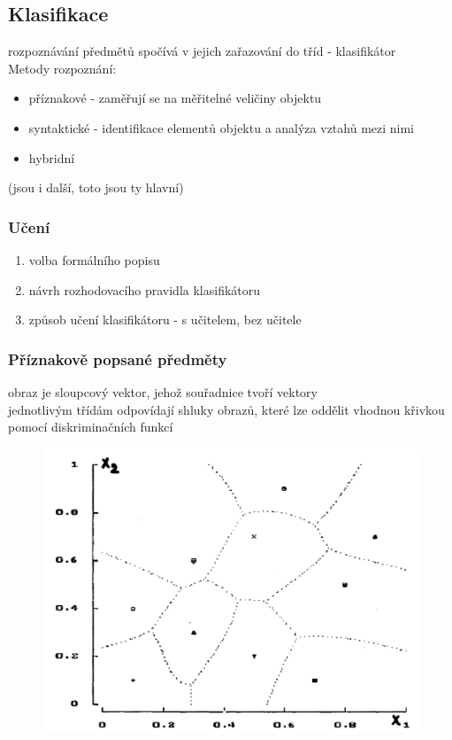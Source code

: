 \subsection*{Klasifikace}
rozpoznávání předmětů spočívá v jejich zařazování do tříd - klasifikátor\\
Metody rozpoznání:
\begin{itemize}
    \item příznakové - zaměřují se na měřitelné veličiny objektu
    \item syntaktické - identifikace elementů objektu a analýza vztahů mezi nimi
    \item hybridní
\end{itemize}
(jsou i další, toto jsou ty hlavní)\\
\subsubsection*{Učení}
\begin{enumerate}
    \item volba formálního popisu
    \item návrh rozhodovacího pravidla klasifikátoru
    \item způsob učení klasifikátoru - s učitelem, bez učitele
\end{enumerate}
\subsubsection*{Příznakově popsané předměty}
obraz je sloupcový vektor, jehož souřadnice tvoří vektory\\
jednotlivým třídám odpovídají shluky obrazů, které lze oddělit vhodnou křivkou pomocí diskriminačních funkcí

\begin{figure}[H]
    \includegraphics[scale = 0.2]{images/priznakove.png}
\end{figure}
\newpage
